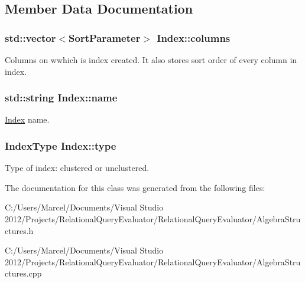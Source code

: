 \subsection{Member Data Documentation}
\hypertarget{class_index_aacff426f599d6f3d4c244456bcf2d594}{
\subsubsection[{columns}]{\setlength{\rightskip}{0pt plus 5cm}std\+::vector$<${\bf Sort\+Parameter}$>$ Index\+::columns}}\label{class_index_aacff426f599d6f3d4c244456bcf2d594}
Columns on wwhich is index created. It also stores sort order of every column in index. \hypertarget{class_index_af557cb673e8298bc13d74e369f050084}{
\subsubsection[{name}]{\setlength{\rightskip}{0pt plus 5cm}std\+::string Index\+::name}}\label{class_index_af557cb673e8298bc13d74e369f050084}
\hyperlink{class_index}{Index} name. \hypertarget{class_index_aa1772697ba294e1df853b8be2cc45409}{
\subsubsection[{type}]{\setlength{\rightskip}{0pt plus 5cm}Index\+Type Index\+::type}}\label{class_index_aa1772697ba294e1df853b8be2cc45409}
Type of index\+: clustered or unclustered. 

The documentation for this class was generated from the following files\+:\begin{DoxyCompactItemize}
\item 
C\+:/\+Users/\+Marcel/\+Documents/\+Visual Studio 2012/\+Projects/\+Relational\+Query\+Evaluator/\+Relational\+Query\+Evaluator/Algebra\+Structures.\+h\item 
C\+:/\+Users/\+Marcel/\+Documents/\+Visual Studio 2012/\+Projects/\+Relational\+Query\+Evaluator/\+Relational\+Query\+Evaluator/Algebra\+Structures.\+cpp\end{DoxyCompactItemize}
